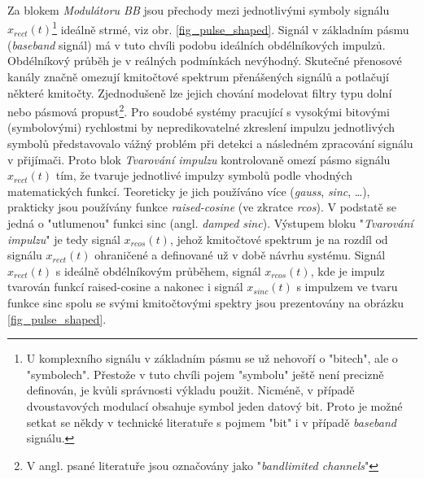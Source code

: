 \marginpar{\textcolor{txt_blue}{Tvarování pulzu}}
Za blokem \textsl{Modulátoru BB} jsou přechody mezi jednotlivými symboly signálu $x_{rect}(t)$\footnote{U komplexního signálu v základním pásmu se už nehovoří o "bitech", ale o "symbolech". Přestože v tuto chvíli pojem "symbolu" ještě není precizně definován, je kvůli správnosti výkladu použit. Nicméně, v případě dvoustavových modulací obsahuje symbol jeden datový bit. Proto je možné setkat se někdy v technické literatuře s pojmem "bit" i v případě \textsl{baseband} signálu.} ideálně strmé, viz obr. \ref{fig_pulse_shaped}. Signál v základním pásmu (\textsl{baseband} signál) má v tuto chvíli podobu ideálních obdélníkových impulzů. Obdélníkový průběh je v reálných podmínkách nevýhodný. Skutečné přenosové kanály značně omezují kmitočtové spektrum přenášených signálů a potlačují některé kmitočty. Zjednodušeně lze jejich chování modelovat filtry typu dolní nebo pásmová propust\footnote{V angl. psané literatuře jsou označovány jako "\textsl{bandlimited channels}"}. Pro soudobé systémy pracující s vysokými bitovými (symbolovými) rychlostmi by nepredikovatelné zkreslení impulzu jednotlivých symbolů představovalo vážný problém při detekci a následném zpracování signálu v přijímači. Proto blok \textsl{Tvarování impulzu} kontrolovaně omezí pásmo signálu $x_{rect}(t)$ tím, že tvaruje jednotlivé impulzy symbolů podle vhodných matematických funkcí. Teoreticky je jich používáno více (\textsl{gauss}, \textsl{sinc}, \ldots), prakticky jsou používány funkce \textsl{raised-cosine} (ve zkratce \textsl{rcos}). V podstatě se jedná o "utlumenou" funkci sinc (angl. \textsl{damped sinc}). Výstupem bloku "\textsl{Tvarování impulzu}" je tedy signál $x_{rcos}(t)$, jehož kmitočtové spektrum je na rozdíl od signálu $x_{rect}(t)$ ohraničené a definované už v době návrhu systému. Signál $x_{rect}(t)$ s ideálně obdélníkovým průběhem, signál $x_{rcos}(t)$, kde je impulz tvarován funkcí raised-cosine a nakonec i signál $x_{sinc}(t)$ s impulzem ve tvaru funkce sinc spolu se svými kmitočtovými spektry jsou prezentovány na obrázku \ref{fig_pulse_shaped}. 



